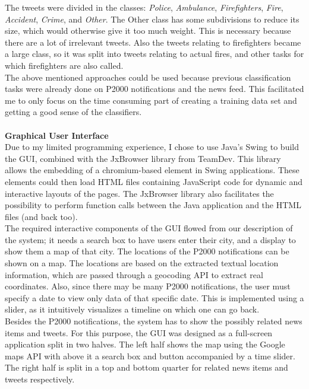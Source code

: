 The tweets were divided in the classes: \emph{Police}, \emph{Ambulance}, \emph{Firefighters}, \emph{Fire}, \emph{Accident}, \emph{Crime}, and \emph{Other}. The Other class has some subdivisions to reduce its size, which would otherwise give it too much weight. This is necessary because there are a lot of irrelevant tweets. Also the tweets relating to firefighters became a large class, so it was split into tweets relating to actual fires, and other tasks for which firefighters are also called.\\

The above mentioned approaches could be used because previous classification tasks were already done on P2000 notifications and the news feed. This facilitated me to only focus on the time consuming part of creating a training data set and getting a good sense of the classifiers.\\
\\
\textbf{Graphical User Interface}\\
Due to my limited programming experience, I chose to use Java's Swing to build the GUI, combined with the JxBrowser library from TeamDev. This library allows the embedding of a chromium-based element in Swing applications. These elements could then load HTML files containing JavaScript code for dynamic and interactive layouts of the pages. The JxBrowser library also facilitates the possibility to perform function calls between the Java application and the HTML files (and back too).\\ 

The required interactive components of the GUI flowed from our description of the system; it needs a search box to have users enter their city, and a display to show them a map of that city. 
The locations of the P2000 notifications can be shown on a map. The locations are based on the extracted textual location information, which are passed through a geocoding API to extract real coordinates. 
Also, since there may be many P2000 notifications, the user must specify a date to view only data of that specific date. This is implemented using a slider, as it intuitively visualizes a timeline on which one can go back. \\
Besides the P2000 notifications, the system has to show the possibly related news items and tweets. For this purpose, the GUI was designed as a full-screen 
application split in two halves. The left half shows the map using the Google maps API with above it a search box and button accompanied by a time slider. The right half is split in a top and bottom quarter for related news items and tweets respectively. \\

